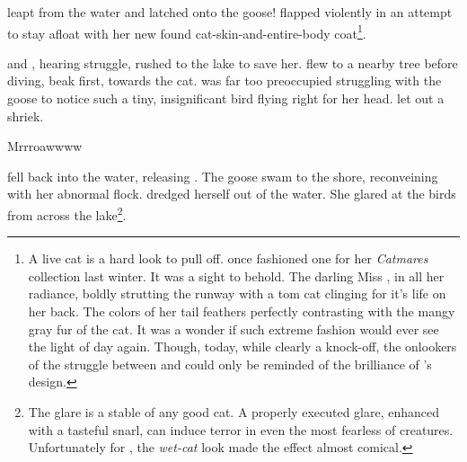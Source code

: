\noindent
\pixel{} leapt from the water and latched onto the goose!
\goose{} flapped violently in an attempt to stay afloat with her new found
cat-skin-and-entire-body coat\footnote{
A live cat is a hard look to pull off.  \peacockF{} once fashioned
one for her \textit{Catmares} collection last winter.  It was a sight to behold.
The darling Miss \peacock, in all her radiance, boldly strutting the runway
with a tom cat clinging for it's life on her back.  The colors of her tail feathers
perfectly contrasting with the mangy gray fur of the cat.  It was a wonder if
such extreme fashion would ever see the light of day again.
Though, today, while clearly a knock-off, the onlookers of the struggle between
\goose{} and \pixel{} could only be reminded of the brilliance of \peacock's design.
}.
\VV


\noindent
\pidgenF{} and \doveF, hearing \goose{} struggle, rushed to the lake to save her.
\dove{} flew to a nearby tree before diving, beak first, towards the cat.
\pixel{} was far too preoccupied struggling with the goose to notice such a tiny,
insignificant bird flying right for her head.  \pixel{} let out a shriek.
\VV


{\Large}Mrrroawwww\normalsize
\VV


\pixel{} fell back into the water, releasing \goose.  The goose swam to the
shore, reconveining with her abnormal flock.
\pixel{} dredged herself out of the water.
She glared at the birds from across the lake\footnote{
The glare is a stable of any good cat.  A properly executed
glare, enhanced with a tasteful snarl, can induce terror in even
the most fearless of creatures.  Unfortunately for \pixel, the
\textit{wet-cat} look made the effect almost comical.
}.

